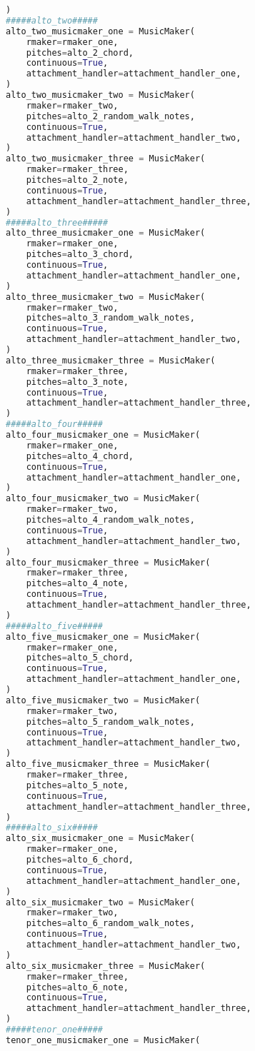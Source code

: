 \begin{lstlisting}[language=Python, caption=Invocation Source Code]
)
#####alto_two#####
alto_two_musicmaker_one = MusicMaker(
    rmaker=rmaker_one,
    pitches=alto_2_chord,
    continuous=True,
    attachment_handler=attachment_handler_one,
)
alto_two_musicmaker_two = MusicMaker(
    rmaker=rmaker_two,
    pitches=alto_2_random_walk_notes,
    continuous=True,
    attachment_handler=attachment_handler_two,
)
alto_two_musicmaker_three = MusicMaker(
    rmaker=rmaker_three,
    pitches=alto_2_note,
    continuous=True,
    attachment_handler=attachment_handler_three,
)
#####alto_three#####
alto_three_musicmaker_one = MusicMaker(
    rmaker=rmaker_one,
    pitches=alto_3_chord,
    continuous=True,
    attachment_handler=attachment_handler_one,
)
alto_three_musicmaker_two = MusicMaker(
    rmaker=rmaker_two,
    pitches=alto_3_random_walk_notes,
    continuous=True,
    attachment_handler=attachment_handler_two,
)
alto_three_musicmaker_three = MusicMaker(
    rmaker=rmaker_three,
    pitches=alto_3_note,
    continuous=True,
    attachment_handler=attachment_handler_three,
)
#####alto_four#####
alto_four_musicmaker_one = MusicMaker(
    rmaker=rmaker_one,
    pitches=alto_4_chord,
    continuous=True,
    attachment_handler=attachment_handler_one,
)
alto_four_musicmaker_two = MusicMaker(
    rmaker=rmaker_two,
    pitches=alto_4_random_walk_notes,
    continuous=True,
    attachment_handler=attachment_handler_two,
)
alto_four_musicmaker_three = MusicMaker(
    rmaker=rmaker_three,
    pitches=alto_4_note,
    continuous=True,
    attachment_handler=attachment_handler_three,
)
#####alto_five#####
alto_five_musicmaker_one = MusicMaker(
    rmaker=rmaker_one,
    pitches=alto_5_chord,
    continuous=True,
    attachment_handler=attachment_handler_one,
)
alto_five_musicmaker_two = MusicMaker(
    rmaker=rmaker_two,
    pitches=alto_5_random_walk_notes,
    continuous=True,
    attachment_handler=attachment_handler_two,
)
alto_five_musicmaker_three = MusicMaker(
    rmaker=rmaker_three,
    pitches=alto_5_note,
    continuous=True,
    attachment_handler=attachment_handler_three,
)
#####alto_six#####
alto_six_musicmaker_one = MusicMaker(
    rmaker=rmaker_one,
    pitches=alto_6_chord,
    continuous=True,
    attachment_handler=attachment_handler_one,
)
alto_six_musicmaker_two = MusicMaker(
    rmaker=rmaker_two,
    pitches=alto_6_random_walk_notes,
    continuous=True,
    attachment_handler=attachment_handler_two,
)
alto_six_musicmaker_three = MusicMaker(
    rmaker=rmaker_three,
    pitches=alto_6_note,
    continuous=True,
    attachment_handler=attachment_handler_three,
)
#####tenor_one#####
tenor_one_musicmaker_one = MusicMaker(

\end{lstlisting}
